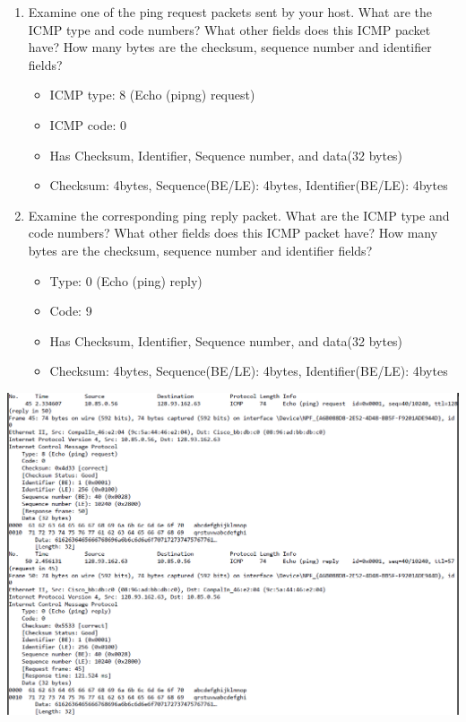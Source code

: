 \documentclass[11pt]{article}
\begin{document}
\begin{enumerate}[label=(\alph*)]
\begin{itemize}
\begin{enumerate}[label=(\arabic*)]
            \item Examine one of the ping request packets sent by your host. What are the ICMP type and code numbers? What other fields does this ICMP packet have? How many bytes are the checksum, sequence number and identifier fields?
                \begin{itemize}
                    \item ICMP type: 8 (Echo (pipng) request)
                    \item ICMP code: 0
                    \item Has Checksum, Identifier, Sequence number, and data(32 bytes)
                    \item Checksum: 4bytes, Sequence(BE/LE): 4bytes, Identifier(BE/LE): 4bytes
                \end{itemize}
            \item Examine the corresponding ping reply packet. What are the ICMP type and code numbers? What other fields does this ICMP packet have? How many bytes are the checksum, sequence number and identifier fields?
                \begin{itemize}
                    \item Type: 0 (Echo (ping) reply)
                    \item Code: 9
                    \item Has Checksum, Identifier, Sequence number, and data(32 bytes)
                    \item Checksum: 4bytes, Sequence(BE/LE): 4bytes, Identifier(BE/LE): 4bytes
                \end{itemize}
            
        \end{enumerate}
         \includegraphics[width=1\textwidth]{HW1Template/Wireshark_ping_print.PNG}
        

\end{itemize}
\end{enumerate}
\end{document}
